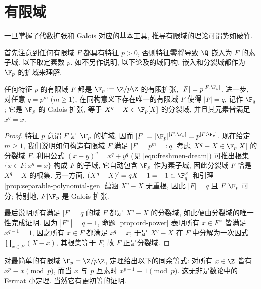 \section{有限域}
一旦掌握了代数扩张和 Galois 对应的基本工具, 推导有限域的理论可谓势如破竹.

首先注意到任何有限域 $F$ 都具有特征 $p > 0$, 否则特征零将导致 $\Q$ 嵌入为 $F$ 的素子域. 以下取定素数 $p$. 如不另作说明, 以下论及的域同构, 嵌入和分裂域都作为 $\F_p$ 的扩域来理解.

\begin{theorem}\label{prop:finite-field-uniqueness} 
	任何特征 $p$ 的有限域 $F$ 都是 $\F_p := \Z/p\Z$ 的有限扩张, $|F| = p^{[F:\F_p]}$. 进一步, 对任意 $q = p^m$ ($m \geq 1$), 在同构意义下存在唯一的有限域 $F$ 使得 $|F|=q$, 记作 $\F_q$; 它是 $\F_p$ 的 Galois 扩张, 等于 $X^q - X \in \F_p[X]$ 的分裂域, 并且其元素皆满足 $x^q = x$.
\end{theorem}
\begin{proof}
	特征 $p$ 意谓 $F$ 是 $\F_p$ 的扩域, 因而 $|F| = |\F_p|^{[F:\F_p]} = p^{[F:\F_p]}$. 现在给定 $m \geq 1$, 我们说明如何构造有限域 $F$ 满足 $|F| = p^m =: q$. 考虑 $X^q - X \in \F_p[X]$ 的分裂域 $F$. 利用公式 $(x+y)^q = x^q + y^q$ (见 \eqref{eqn:freshmen-dream}) 可推出根集 $\{ x \in F: x^q = x \}$ 构成 $F$ 的子域, 它自动包含 $\F_p$ 作为素子域, 因此分裂域 $F$ 恰是 $X^q-X$ 的根集. 另一方面, $(X^q - X)' = qX-1 = -1 \in \F_q^\times$ 和引理 \ref{prop:separable-polynomial-gen} 蕴涵 $X^q-X$ 无重根, 因此 $|F|=q$ 且 $F|\F_p$ 可分; 特别地, $F|\F_p$ 是 Galois 扩张.

	最后说明所有满足 $|F|=q$ 的域 $F$ 都是 $X^q-X$ 的分裂域, 如此便由分裂域的唯一性完成证明. 因为 $|F^\times| = q-1$, 命题 \ref{prop:ord-power} 表明所有 $x \in F^\times$ 皆满足 $x^{q-1}=1$, 因之所有 $x \in F$ 都满足 $x^q=x$; 于是 $X^q-X$ 在 $F$ 中分解为一次因式 $\prod_{x \in F} (X-x)$, 其根集等于 $F$, 故 $F$ 正是分裂域.
\end{proof}

\begin{remark}\label{rem:Fermat-little} 
	对最简单的有限域 $\F_p = \Z/p\Z$, 定理给出以下的同余等式: 对所有 $x \in \Z$ 皆有 $x^p \equiv x \pmod p$, 而当 $x$ 与 $p$ 互素时 $x^{p-1} \equiv 1 \pmod p$. 这无非是数论中的 Fermat 小定理. 当然它有更初等的证明.
\end{remark}

